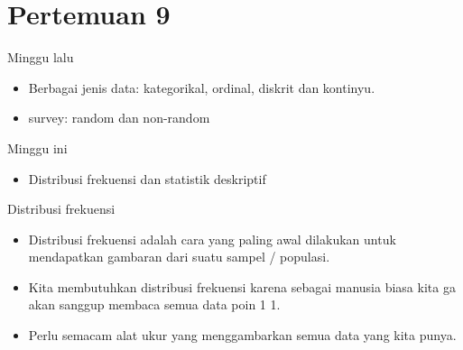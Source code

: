 \documentclass[
  ignorenonframetext,
]{beamer}
\providecommand{\tightlist}{%
  \setlength{\itemsep}{0pt}\setlength{\parskip}{0pt}}\usepackage{longtable,booktabs,array}
\begin{document}
\section{Pertemuan 9}\label{pertemuan-9}

\begin{frame}{Minggu lalu}
\label{minggu-lalu-2}
\begin{itemize}
\item
  Berbagai jenis data: kategorikal, ordinal, diskrit dan kontinyu.
\item
  survey: random dan non-random
\end{itemize}

\begin{block}{Minggu ini}
\label{minggu-ini}
\begin{itemize}
\tightlist
\item
  Distribusi frekuensi dan statistik deskriptif
\end{itemize}
\end{block}
\end{frame}

\begin{frame}{Distribusi frekuensi}
\label{distribusi-frekuensi}
\begin{itemize}
\item
  Distribusi frekuensi adalah cara yang paling awal dilakukan untuk
  mendapatkan gambaran dari suatu sampel / populasi.
\item
  Kita membutuhkan distribusi frekuensi karena sebagai manusia biasa
  kita ga akan sanggup membaca semua data poin 1 1.
\item
  Perlu semacam alat ukur yang menggambarkan semua data yang kita punya.
\end{itemize}
\end{frame}
\end{document}

